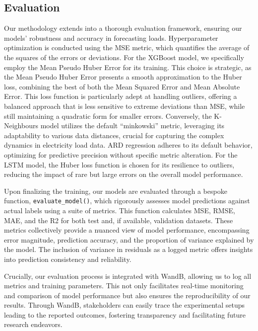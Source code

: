 \documentclass{article} %
\begin{document}
\subsection{Evaluation}
Our methodology extends into a thorough evaluation framework, ensuring our models' robustness and accuracy in forecasting loads.
Hyperparameter optimization is conducted using the \gls{MSE} metric, which quantifies the average of the squares of the errors or deviations. For the XGBoost model, we specifically employ the Mean Pseudo Huber Error for its training. This choice is strategic, as the Mean Pseudo Huber Error presents a smooth approximation to the Huber loss, combining the best of both the Mean Squared Error and Mean Absolute Error. This loss function is particularly adept at handling outliers, offering a balanced approach that is less sensitive to extreme deviations than \gls{MSE}, while still maintaining a quadratic form for smaller errors. Conversely, the K-Neighbours model utilizes the default “minkowski” metric, leveraging its adaptability to various data distances, crucial for capturing the complex dynamics in electricity load data. \gls{ARD} regression adheres to its default behavior, optimizing for predictive precision without specific metric alteration. For the \gls{LSTM} model, the Huber loss function is chosen for its resilience to outliers, reducing the impact of rare but large errors on the overall model performance. 

Upon finalizing the training, our models are evaluated through a bespoke function, \texttt{evaluate\_model()}, which rigorously assesses model predictions against actual labels using a suite of metrics. This function calculates \gls{MSE}, \gls{RMSE}, \gls{MAE}, and the \gls{R2} for both test and, if available, validation datasets. These metrics collectively provide a nuanced view of model performance, encompassing error magnitude, prediction accuracy, and the proportion of variance explained by the model. The inclusion of variance in residuals as a logged metric offers insights into prediction consistency and reliability. 

Crucially, our evaluation process is integrated with \gls{WandB}, allowing us to log all metrics and training parameters. This not only facilitates real-time monitoring and comparison of model performance but also ensures the reproducibility of our results. Through \gls{WandB}, stakeholders can easily trace the experimental setups leading to the reported outcomes, fostering transparency and facilitating future research endeavors. 
\end{document}
